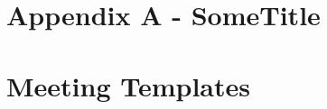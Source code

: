 \documentclass{article}
\begin{document}
\renewcommand{\thepage}{\roman{page}}




\newpage
\setcounter{page}{1}
\renewcommand{\thepage}{\arabic{page}}

\newpage


\newpage


\newpage


\newpage


\newpage


\newpage


\newpage



\appendix

\newpage
\section{Appendix A - SomeTitle}

\newpage


\newpage


\newpage
\section{Meeting Templates}


\end{document}
